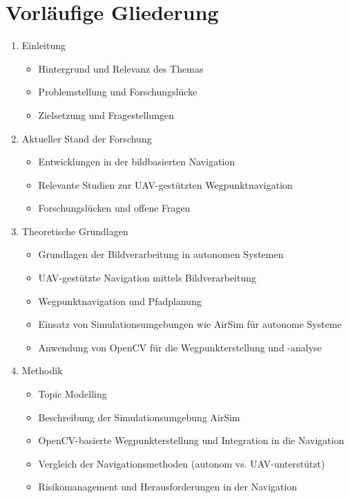 \section{Vorläufige Gliederung}

\begin{enumerate}
    \item Einleitung
    \begin{itemize}
        \item Hintergrund und Relevanz des Themas
        \item Problemstellung und Forschungslücke
        \item Zielsetzung und Fragestellungen
    \end{itemize}
    
    \item Aktueller Stand der Forschung
    \begin{itemize}
        \item Entwicklungen in der bildbasierten Navigation
        \item Relevante Studien zur UAV-gestützten Wegpunktnavigation
        \item Forschungslücken und offene Fragen
    \end{itemize}
    
    \item Theoretische Grundlagen
    \begin{itemize}
        \item Grundlagen der Bildverarbeitung in autonomen Systemen
        \item UAV-gestützte Navigation mittels Bildverarbeitung
        \item Wegpunktnavigation und Pfadplanung
        \item Einsatz von Simulationsumgebungen wie \gls{AirSim} für autonome Systeme
        \item Anwendung von \gls{OpenCV} für die Wegpunkterstellung und -analyse
    \end{itemize}
    
    \item Methodik
    \begin{itemize}
        \item Topic Modelling
        \item Beschreibung der Simulationsumgebung \gls{AirSim}
        \item \gls{OpenCV}-basierte Wegpunkterstellung und Integration in die Navigation
        \item Vergleich der Navigationsmethoden (autonom vs. UAV-unterstützt)
        \item Risikomanagement und Herausforderungen in der Navigation
    \end{itemize}
    

\end{enumerate}
